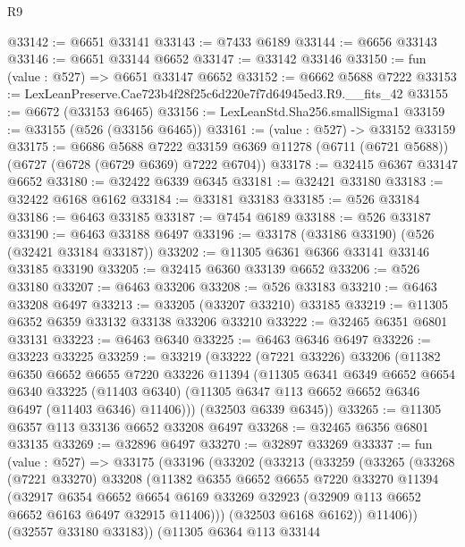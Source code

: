 \begin{lexlean}{R9}
\begin{coremodule}
@33142 := @6651 @33141
@33143 := @7433 @6189
@33144 := @6656 @33143
@33146 := @6651 @33144 @6652
@33147 := @33142 @33146
@33150 := fun (value : @527) => @6651 @33147 @6652
@33152 := @6662 @5688 @7222
@33153 := LexLeanPreserve.Cae723b4f28f25c6d220e7f7d64945ed3.R9.__fits_42
@33155 := @6672 (@33153 @6465)
@33156 := LexLeanStd.Sha256.smallSigma1
@33159 := @33155 (@526 (@33156 @6465))
@33161 := (value : @527) -> @33152 @33159
@33175 := @6686
    @5688
    @7222
    @33159
    @6369
    @11278
    (@6711 (@6721 @5688))
    (@6727 (@6728 (@6729 @6369) @7222 @6704))
@33178 := @32415 @6367 @33147 @6652
@33180 := @32422 @6339 @6345
@33181 := @32421 @33180
@33183 := @32422 @6168 @6162
@33184 := @33181 @33183
@33185 := @526 @33184
@33186 := @6463 @33185
@33187 := @7454 @6189
@33188 := @526 @33187
@33190 := @6463 @33188 @6497
@33196 := @33178 (@33186 @33190) (@526 (@32421 @33184 @33187))
@33202 := @11305 @6361 @6366 @33141 @33146 @33185 @33190
@33205 := @32415 @6360 @33139 @6652
@33206 := @526 @33180
@33207 := @6463 @33206
@33208 := @526 @33183
@33210 := @6463 @33208 @6497
@33213 := @33205 (@33207 @33210) @33185
@33219 := @11305 @6352 @6359 @33132 @33138 @33206 @33210
@33222 := @32465 @6351 @6801 @33131
@33223 := @6463 @6340
@33225 := @6463 @6346 @6497
@33226 := @33223 @33225
@33259 := @33219
    (@33222
      (@7221 @33226)
      @33206
      (@11382
        @6350
        @6652
        @6655
        @7220
        @33226
        @11394
        (@11305
          @6341
          @6349
          @6652
          @6654
          @6340
          @33225
          (@11403 @6340)
          (@11305 @6347 @113 @6652 @6652 @6346 @6497 (@11403 @6346) @11406)))
      (@32503 @6339 @6345))
@33265 := @11305 @6357 @113 @33136 @6652 @33208 @6497
@33268 := @32465 @6356 @6801 @33135
@33269 := @32896 @6497
@33270 := @32897 @33269
@33337 := fun (value : @527) =>
  @33175
    (@33196
      (@33202
        (@33213
          (@33259
            (@33265
              (@33268
                (@7221 @33270)
                @33208
                (@11382
                  @6355
                  @6652
                  @6655
                  @7220
                  @33270
                  @11394
                  (@32917
                    @6354
                    @6652
                    @6654
                    @6169
                    @33269
                    @32923
                    (@32909 @113 @6652 @6652 @6163 @6497 @32915 @11406)))
                (@32503 @6168 @6162))
              @11406))
          (@32557 @33180 @33183))
        (@11305
          @6364
          @113
          @33144

\end{coremodule}
\end{lexlean}
